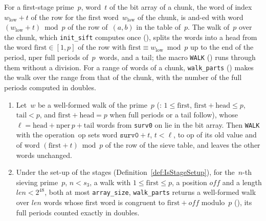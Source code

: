 For a first-stage prime~$p$, word~$t$ of the bit array of a chunk, the word of index
$w_{\mathrm{low}} + t$ of the row for the first word~$w_{\mathrm{low}}$ of the chunk, is and-ed
with word $(w_{\mathrm{low}} + t) \bmod p$ of the row of~$(a, b)$ in the table of~$p$. The walk of~$p$ over the
chunk, which \texttt{init\_sift} computes once (), splits the words
into a head from the word $\mathrm{first} \in [1, p]$ of the row with
$\mathrm{first} \equiv w_{\mathrm{low}} \bmod p$ up to the end of the period, $\mathrm{nper}$ full
periods of~$p$~words, and a tail; the macro \texttt{WALK} () runs
through them without a division. For a range of words of a chunk, \texttt{walk\_parts}
() makes the walk over the range from that of the chunk, with the
number of the full periods computed in doubles.


\begin{lemma}\label{lem:walk_spec}
  \leanok
  \begin{enumerate}
    \item Let~$w$ be a well-formed walk of the prime~$p$ (:
      $1 \le \mathrm{first}$, $\mathrm{first} + \mathrm{head} \le p$, $\mathrm{tail} < p$, and
      $\mathrm{first} + \mathrm{head} = p$ when full periods or a tail follow), whose
      $\ell = \mathrm{head} + \mathrm{nper}\, p + \mathrm{tail}$ words from \texttt{surv0} on lie
      in the bit array. Then \texttt{WALK} with the operation~$\mathrm{op}$ sets word
      $\texttt{surv0} + t$, $t < \ell$, to $\mathrm{op}$ of its old value and of word
      $(\mathrm{first} + t) \bmod p$ of the row of the sieve table, and leaves the other words
      unchanged.
    \item Under the set-up of the stages (Definition~\ref{def:IsStageSetup}), for the~$n$-th
      sieving prime~$p$, $n < s_3$, a walk with $1 \le \mathrm{first} \le p$, a position
      $\mathit{off}$ and a length $\mathit{len} < 2^{48}$, both at most \texttt{array\_size},
      \texttt{walk\_parts} returns a well-formed walk over $\mathit{len}$ words whose first word is
      congruent to $\mathrm{first} + \mathit{off}$ modulo~$p$ (),
      its full periods counted exactly in doubles.
  \end{enumerate}
\end{lemma}

